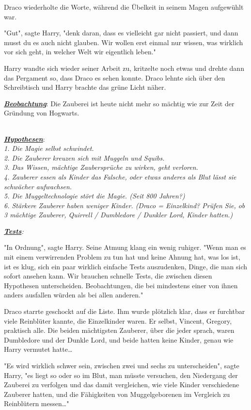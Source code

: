 {Draco wiederholte die Worte, während die Übelkeit in seinem Magen aufgewühlt war.

"Gut", sagte Harry, "denk daran, dass es vielleicht gar nicht passiert, und dann musst du es auch nicht glauben. Wir wollen erst einmal nur wissen, was wirklich vor sich geht, in welcher Welt wir eigentlich leben."

Harry wandte sich wieder seiner Arbeit zu, kritzelte noch etwas und drehte dann das Pergament so, dass Draco es sehen konnte. Draco lehnte sich über den Schreibtisch und Harry brachte das grüne Licht näher.

\emph{\textbf{\uline{Beobachtung}}}: Die Zauberei ist heute nicht mehr so mächtig wie zur Zeit der Gründung von Hogwarts.\\ \strut \\ \emph{\textbf{\uline{Hypothesen}}}:\\ \emph{1. Die Magie selbst schwindet.\\ 2. Die Zauberer kreuzen sich mit Muggeln und Squibs.\\ 3. Das Wissen, mächtige Zaubersprüche zu wirken, geht verloren.\\ 4. Zauberer essen als Kinder das Falsche, oder etwas anderes als Blut lässt sie schwächer aufwachsen.\\ 5. Die Muggeltechnologie stört die Magie. (Seit 800 Jahren?)\\ 6. Stärkere Zauberer haben weniger Kinder. (Draco = Einzelkind? Prüfen Sie, ob 3 mächtige Zauberer, Quirrell / Dumbledore / Dunkler Lord, Kinder hatten.)}

\textbf{\emph{\uline{Tests}}}\emph{:}

"In Ordnung", sagte Harry. Seine Atmung klang ein wenig ruhiger. "Wenn man es mit einem verwirrenden Problem zu tun hat und keine Ahnung hat, was los ist, ist es klug, sich ein paar wirklich einfache Tests auszudenken, Dinge, die man sich sofort ansehen kann. Wir brauchen schnelle Tests, die zwischen diesen Hypothesen unterscheiden. Beobachtungen, die bei mindestens einer von ihnen anders ausfallen würden als bei allen anderen."

Draco starrte geschockt auf die Liste. Ihm wurde plötzlich klar, dass er furchtbar viele Reinblüter kannte, die Einzelkinder waren. Er selbst, Vincent, Gregory, praktisch alle. Die beiden mächtigsten Zauberer, über die jeder sprach, waren Dumbledore und der Dunkle Lord, und beide hatten keine Kinder, genau wie Harry vermutet hatte…

"Es wird wirklich schwer sein, zwischen zwei und sechs zu unterscheiden", sagte Harry, "es liegt so oder so im Blut, man müsste versuchen, den Niedergang der Zauberei zu verfolgen und das damit vergleichen, wie viele Kinder verschiedene Zauberer hatten, und die Fähigkeiten von Muggelgeborenen im Vergleich zu Reinblütern messen…"

}
